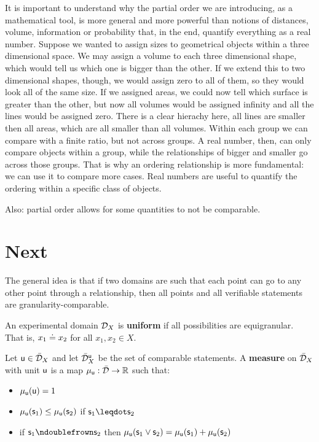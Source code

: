 \documentclass[11pt,letterpaper,fleqn]{memoir} %
\begin{document}
It is important to understand why the partial order we are introducing, as a mathematical tool, is more general and more powerful than notions of distances, volume, information or probability that, in the end, quantify everything as a real number. Suppose we wanted to assign sizes to geometrical objects within a three dimensional space. We may assign a volume to each three dimensional shape, which would tell us which one is bigger than the other. If we extend this to two dimensional shapes, though, we would assign zero to all of them, so they would look all of the same size. If we assigned areas, we could now tell which surface is greater than the other, but now all volumes would be assigned infinity and all the lines would be assigned zero. There is a clear hierachy here, all lines are smaller then all areas, which are all smaller than all volumes. Within each group we can compare with a finite ratio, but not across groups. A real number, then, can only compare objects within a group, while the relationships of bigger and smaller go across those groups. That is why an ordering relationship is more fundamental: we can use it to compare more cases. Real numbers are useful to quantify the ordering within a specific class of objects.

Also: partial order allows for some quantities to not be comparable.

\section{Next}

The general idea is that if two domains are such that each point can go to any other point through a relationship, then all points and all verifiable statements are granularity-comparable.

\begin{defn}
	An experimental domain $\edomain_X$ is \textbf{uniform} if all possibilities are equigranular. That is, $x_1 \eqgran x_2$ for all $x_1, x_2 \in X$.
\end{defn}

\begin{defn}
	Let $\stmt[u] \in \tdomain_X$ and let $\tdomain_X^{\stmt[u]}$ be the set of comparable statements. A \textbf{measure} on $\tdomain_X$ with unit $\stmt[u]$ is a map $\mu_{\stmt[u]} : \tdomain \to \mathbb{R}$ such that:
	\begin{itemize}
		\item $\mu_{\stmt[u]}(\stmt[u]) = 1$
		\item $\mu_{\stmt[u]}(\stmt_1) \leq \mu_{\stmt[u]}(\stmt_2)$ if $\stmt_1 \finer \stmt_2$
		\item if $\stmt_1 \ncomp \stmt_2$ then $\mu_{\stmt[u]}(\stmt_1 \OR \stmt_2) =  \mu_{\stmt[u]}(\stmt_1) + \mu_{\stmt[u]}(\stmt_2)$
	\end{itemize}
\end{defn}
\end{document}
